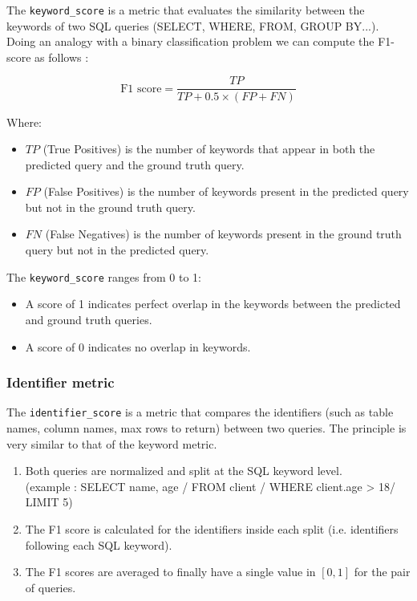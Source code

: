 \documentclass[12pt,a4paper]{article}
\begin{document}
The \texttt{keyword\_score} is a metric that evaluates the similarity between the keywords of two SQL queries (SELECT, WHERE, FROM, GROUP BY...). Doing an analogy with a binary classification problem we can compute the F1-score as follows :

\[
\text{F1 score} = \frac{TP}{TP + 0.5 \times (FP + FN)}
\]

\noindent Where:

\begin{itemize}
  \item \( TP \) (True Positives) is the number of keywords that appear in both the predicted query and the ground truth query.
  \item \( FP \) (False Positives) is the number of keywords present in the predicted query but not in the ground truth query.
  \item \( FN \) (False Negatives) is the number of keywords present in the ground truth query but not in the predicted query.
\end{itemize}

\noindent The \texttt{keyword\_score} ranges from 0 to 1:
\begin{itemize}
  \item A score of 1 indicates perfect overlap in the keywords between the predicted and ground truth queries.
  \item A score of 0 indicates no overlap in keywords.
\end{itemize}

\subsubsection*{Identifier metric}

The \texttt{identifier\_score} is a metric that compares the identifiers (such as table names, column names, max rows to return) between two queries. The principle is very similar to that of the keyword metric.

\begin{enumerate}
    \item Both queries are normalized and split at the SQL keyword level. \\ (example : SELECT name, age / FROM client / WHERE client.age > 18/ LIMIT 5)
    \item The F1 score is calculated for the identifiers inside each split (i.e. identifiers following each SQL keyword).
    \item The F1 scores are averaged to finally have a single value in $[0, 1]$ for the pair of queries.
\end{enumerate}
\end{document}
